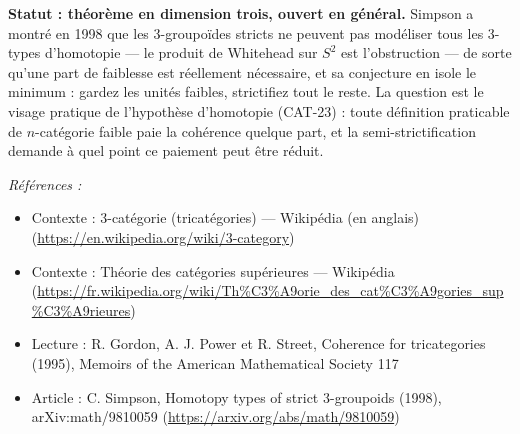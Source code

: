 \documentclass[11pt]{article}
\newenvironment{refs}{\par\small\noindent\emph{Références :}\begin{itemize}\setlength\itemsep{0pt}}{\end{itemize}\normalsize}
\begin{document}
\noindent \textbf{Statut : théorème en dimension trois, ouvert en général.} Simpson a montré
en 1998 que les 3-groupoïdes stricts ne peuvent pas modéliser tous les 3-types d'homotopie --- le
produit de Whitehead sur $ S^2 $ est l'obstruction --- de sorte qu'une part de faiblesse est
réellement nécessaire, et sa conjecture en isole le minimum : gardez les unités faibles,
strictifiez tout le reste. La question est le visage pratique de l'hypothèse d'homotopie
(CAT-23) : toute définition praticable de $ n $-catégorie faible paie la cohérence quelque part,
et la semi-strictification demande à quel point ce paiement peut être réduit.

\begin{refs}
\item Contexte : 3-catégorie (tricatégories) --- Wikipédia (en anglais) (\url{https://en.wikipedia.org/wiki/3-category})
\item Contexte : Théorie des catégories supérieures --- Wikipédia (\url{https://fr.wikipedia.org/wiki/Th%C3%A9orie_des_cat%C3%A9gories_sup%C3%A9rieures})
\item Lecture : R. Gordon, A. J. Power et R. Street, \og{} Coherence for tricategories \fg{} (1995), Memoirs of the American Mathematical Society 117
\item Article : C. Simpson, \og{} Homotopy types of strict 3-groupoids \fg{} (1998), arXiv:math/9810059 (\url{https://arxiv.org/abs/math/9810059})
\end{refs}

\bigskip
\end{document}
